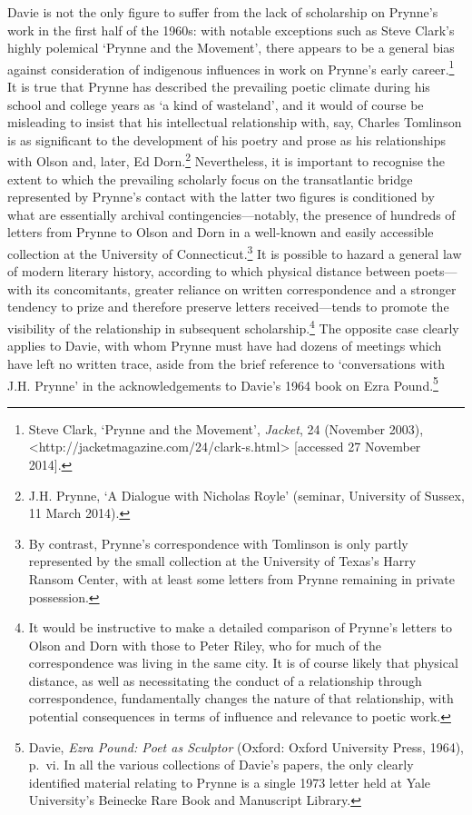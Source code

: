 \documentclass[]{article}
\begin{document}
Davie is not the only figure to suffer from the lack of scholarship on
Prynne’s work in the first half of the 1960s: with notable exceptions
such as Steve Clark’s highly polemical ‘Prynne and the Movement’, there
appears to be a general bias against consideration of indigenous
influences in work on Prynne’s early career.\footnote{Steve Clark,
  ‘Prynne and the Movement’, \emph{Jacket}, 24 (November 2003),
  \textless{}http://jacketmagazine.com/24/clark-s.html\textgreater{}
  {[}accessed 27 November 2014{]}.} It is true that Prynne has described
the prevailing poetic climate during his school and college years as ‘a
kind of wasteland’, and it would of course be misleading to insist that
his intellectual relationship with, say, Charles Tomlinson is as
significant to the development of his poetry and prose as his
relationships with Olson and, later, Ed Dorn.\footnote{J.H. Prynne, ‘A
  Dialogue with Nicholas Royle’ (seminar, University of Sussex, 11 March
  2014).} Nevertheless, it is important to recognise the extent to which
the prevailing scholarly focus on the transatlantic bridge represented
by Prynne’s contact with the latter two figures is conditioned by what
are essentially archival contingencies—notably, the presence of hundreds
of letters from Prynne to Olson and Dorn in a well-known and easily
accessible collection at the University of Connecticut.\footnote{By
  contrast, Prynne’s correspondence with Tomlinson is only partly
  represented by the small collection at the University of Texas’s Harry
  Ransom Center, with at least some letters from Prynne remaining in
  private possession.} It is possible to hazard a general law of modern
literary history, according to which physical distance between
poets—with its concomitants, greater reliance on written correspondence
and a stronger tendency to prize and therefore preserve letters
received—tends to promote the visibility of the relationship in
subsequent scholarship.\footnote{It would be instructive to make a
  detailed comparison of Prynne’s letters to Olson and Dorn with those
  to Peter Riley, who for much of the correspondence was living in the
  same city. It is of course likely that physical distance, as well as
  necessitating the conduct of a relationship through correspondence,
  fundamentally changes the nature of that relationship, with potential
  consequences in terms of influence and relevance to poetic work.} The
opposite case clearly applies to Davie, with whom Prynne must have had
dozens of meetings which have left no written trace, aside from the
brief reference to ‘conversations with J.H. Prynne’ in the
acknowledgements to Davie’s 1964 book on Ezra Pound.\footnote{Davie,
  \emph{Ezra Pound: Poet as Sculptor} (Oxford: Oxford University Press,
  1964), p.~vi. In all the various collections of Davie’s papers, the
  only clearly identified material relating to Prynne is a single 1973
  letter held at Yale University’s Beinecke Rare Book and Manuscript
  Library.}
\end{document}
